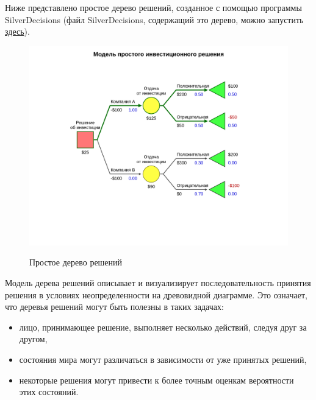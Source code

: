 Ниже представлено простое дерево решений, созданное с помощью программы SilverDecisions (файл SilverDecisions, содержащий это дерево, можно запустить \href{http://silverdecisions.pl/SilverDecisions.html?LOAD_SD_TREE_JSON=https://raw.githubusercontent.com/gubkin-rienm/isp/master/data/decision_tree/simple_invest_decision.json}{здесь}).

\begin{figure}[h!]
	\includegraphics[width= 15cm]{pics/simple_decision_tree_1.png} 
	\label{fig:sample}
	\caption{Простое дерево решений}
\end{figure}

Модель дерева решений описывает и визуализирует последовательность принятия решения в условиях неопределенности на древовидной диаграмме. Это означает, что деревья решений могут быть полезны в таких задачах:
\begin{itemize}
    \item лицо, принимающее решение, выполняет несколько действий, следуя друг за другом,
    \item состояния мира могут различаться в зависимости от уже принятых решений,
    \item некоторые решения могут привести к более точным оценкам вероятности этих состояний.
\end{itemize}

